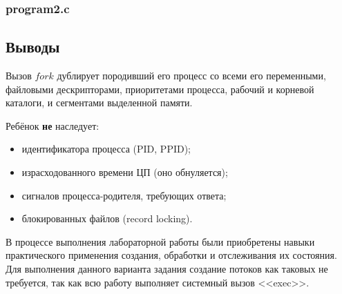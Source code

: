 \documentclass[12pt]{article}
\begin{document}
	
	
	\subsubsection*{program2.c}
	
	
	
	\subsection*{Выводы}
	
	Вызов $fork$ дублирует породивший его процесс со всеми его переменными, файловыми дескрипторами, приоритетами процесса, рабочий и корневой каталоги, и сегментами выделенной памяти.
	
	Ребёнок {\bf не} наследует:
	\begin{itemize}
		\item идентификатора процесса (PID, PPID);
		\item израсходованного времени ЦП (оно обнуляется);
		\item сигналов процесса-родителя, требующих ответа;
		\item блокированных файлов (record locking).
	\end{itemize}
	
	В процессе выполнения лабораторной работы были приобретены навыки практического применения создания, обработки и отслеживания их состояния. Для выполнения данного варианта задания создание потоков как таковых не требуется, так как всю работу выполняет системный вызов <<exec>>.
	
\end{document}
